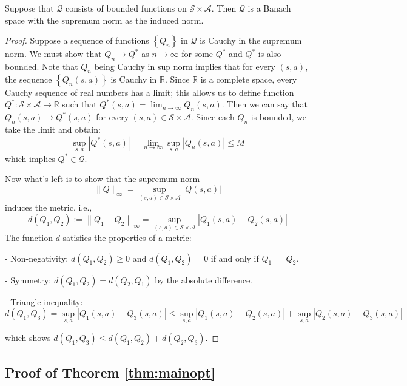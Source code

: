 \begin{lem}\label{lem:completeMetric} Suppose that $\mathcal{Q}$ consists of bounded functions on $\mathcal{S} \times \mathcal{A}$. Then $\mathcal{Q}$ is a Banach space with the supremum norm as the induced norm.
\end{lem}
\begin{proof}
Suppose a sequence of functions $\left\{Q_n\right\}$ in $\mathcal{Q}$ is Cauchy in the supremum norm. We must show that $ Q_n\rightarrow Q^\ast$ as $n\rightarrow \infty$ for some $Q^\ast$ and $Q^\ast$ is also bounded. %
Note that $Q_n$ being Cauchy in sup norm implies that for every $(s, a)$, the sequence $\left\{Q_n(s, a)\right\}$ is Cauchy in $\mathbb{R}$. Since $\mathbb{R}$ is a complete space, every Cauchy sequence of real numbers has a limit; this allows us to define function $Q^\ast:\mathcal{S}\times \mathcal{A} \mapsto \mathbb{R}$ such that $Q^*(s, a)=\lim _{n \rightarrow \infty} Q_n(s, a)$. Then we can say that $Q_n(s, a) \rightarrow Q^*(s, a) $ for every $(s, a) \in \mathcal{S} \times \mathcal{A}$. Since each $Q_n$ is bounded, we take the limit and obtain:
$$
\sup _{s, a}\left|Q^*(s, a)\right|=\lim _{n \rightarrow \infty} \sup _{s, a}\left|Q_n(s, a)\right| \leq M
$$
which implies $Q^* \in \mathcal{Q}$.

\noindent Now what's left is to show that the supremum norm
$$
\|Q\|_{\infty}=\sup _{(s, a) \in \mathcal{S} \times \mathcal{A}}|Q(s, a)|
$$
induces the metric, i.e., 
$$
d\left(Q_1, Q_2\right):=\left\|Q_1-Q_2\right\|_{\infty}=\sup _{(s, a) \in \mathcal{S} \times \mathcal{A}}\left|Q_1(s, a)-Q_2(s, a)\right|
$$
The function $d$ satisfies the properties of a metric:

- Non-negativity: $d\left(Q_1, Q_2\right) \geq 0$ and $d\left(Q_1, Q_2\right)=0$ if and only if $Q_1=$ $Q_2$.

- Symmetry: $d\left(Q_1, Q_2\right)=d\left(Q_2, Q_1\right)$ by the absolute difference.

- Triangle inequality:
$$
d\left(Q_1, Q_3\right)=\sup _{s, a}\left|Q_1(s, a)-Q_3(s, a)\right| \leq \sup _{s, a}\left|Q_1(s, a)-Q_2(s, a)\right|+\sup _{s, a}\left|Q_2(s, a)-Q_3(s, a)\right|
$$

which shows $d\left(Q_1, Q_3\right) \leq d\left(Q_1, Q_2\right)+d\left(Q_2, Q_3\right)$.


\end{proof}

\subsection{Proof of Theorem 
\ref{thm:mainopt}}\label{sec:pfOfmainOpt}

